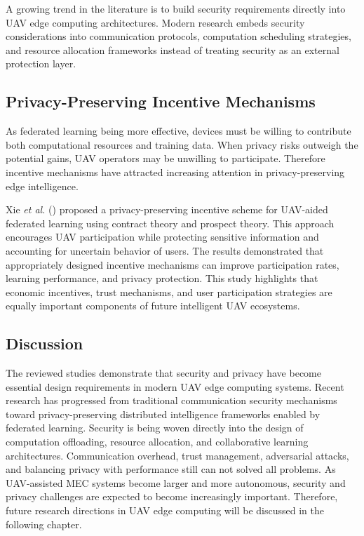 \documentclass[a4paper, 12pt]{article}
\begin{document}
A growing trend in the literature is to build security requirements directly into UAV edge computing architectures. Modern research embeds security considerations into communication protocols, computation scheduling strategies, and resource allocation frameworks instead of treating security as an external protection layer.

\subsection*{Privacy-Preserving Incentive Mechanisms}
As federated learning being more effective, devices must be willing to contribute both computational resources and training data. When privacy risks outweigh the potential gains, UAV operators may be unwilling to participate. Therefore incentive mechanisms have attracted increasing attention in privacy-preserving edge intelligence.

Xie \textit{et al.} (\cite{Xie2025Privacy}) proposed a privacy-preserving incentive scheme for UAV-aided federated learning using contract theory and prospect theory. This approach encourages UAV participation while protecting sensitive information and accounting for uncertain behavior of users. The results demonstrated that appropriately designed incentive mechanisms can improve participation rates, learning performance, and privacy protection. This study highlights that economic incentives, trust mechanisms, and user participation strategies are equally important components of future intelligent UAV ecosystems.

\subsection*{Discussion}
The reviewed studies demonstrate that security and privacy have become essential design requirements in modern UAV edge computing systems. Recent research has progressed from traditional communication security mechanisms toward privacy-preserving distributed intelligence frameworks enabled by federated learning. Security is being woven directly into the design of computation offloading, resource allocation, and collaborative learning architectures. Communication overhead, trust management, adversarial attacks, and balancing privacy with performance still can not solved all problems. As UAV-assisted MEC systems become larger and more autonomous, security and privacy challenges are expected to become increasingly important. Therefore, future research directions in UAV edge computing will be discussed in the following chapter.
\end{document}
